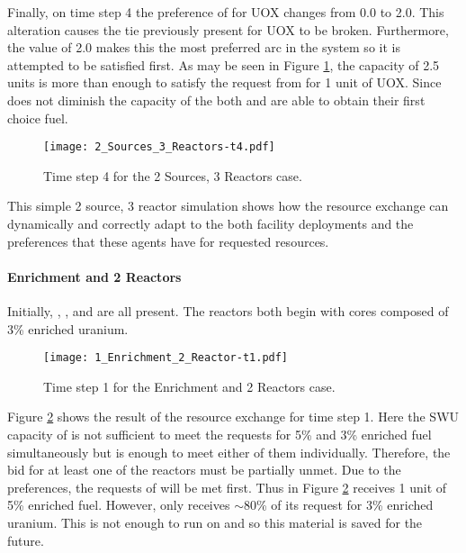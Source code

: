 Finally, on time step 4 the preference of  for UOX changes from 
0.0 to 2.0.  This alteration causes the tie previously present 
for UOX to be broken.  Furthermore, the value of 2.0 makes this the most 
preferred arc in the system so it is attempted to be satisfied first.  
As may be seen in Figure \ref{fig::2srcs3rxts-t4}, the \UOXSource{} capacity of
2.5 units is more than enough to satisfy the request from  for 1 unit of UOX.
Since  does not diminish the capacity of the \MOXSource{} both  
and  are able to obtain their first choice fuel.

\begin{figure}
  \begin{center}
    \texttt{[image: 2\_Sources\_3\_Reactors-t4.pdf]}
    \caption[]{\label{fig::2srcs3rxts-t4}Time step 4 for the 2 Sources, 3 Reactors 
        case.}
  \end{center}
\end{figure}

This simple 2 source, 3 reactor simulation shows how the resource 
exchange can dynamically and correctly adapt to the both facility deployments and
the preferences that these agents have for requested resources.

\paragraph{Enrichment and 2 Reactors}
\label{subsect::1enr2rxts}

Initially, \Enrichment{}, , and  are all present. The reactors both begin with cores composed of 3\% enriched uranium. 

\begin{figure}
  \begin{center}
    \texttt{[image: 1\_Enrichment\_2\_Reactor-t1.pdf]}
    \caption[]{\label{fig::enr2rxts-t1}Time step 1 for the Enrichment and 2 Reactors 
        case.}
  \end{center}
\end{figure}

Figure \ref{fig::enr2rxts-t1} shows the result of the resource exchange for time
step 1.  Here the SWU capacity of \Enrichment{} is not sufficient to meet the
requests for 5\% and 3\% enriched fuel simultaneously but is enough to meet
either of them individually.  Therefore, the bid for at least one of the
reactors must be partially unmet.  Due to the preferences, the requests
of  will be met first.  Thus in
Figure \ref{fig::enr2rxts-t1}  receives 1 unit of 5\% enriched fuel.
However,  only receives $\sim$80\% of its request for 3\% enriched
uranium.  This is not enough to run on and so this material is saved for the
future.

